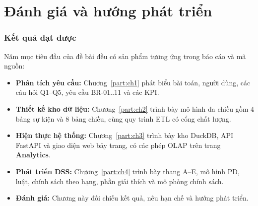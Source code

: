 \part{Đánh giá và hướng phát triển}
\label{part:ch5}
\section{Kết quả đạt được}
\label{sec:eval-results}
Năm mục tiêu đầu của đề bài đều có sản phẩm tương ứng trong báo cáo và mã nguồn:
\begin{itemize}[topsep=0pt, itemsep=1pt]
	\item \textbf{Phân tích yêu cầu:} Chương~\ref{part:ch1} phát biểu bài toán, người dùng, các câu hỏi Q1--Q5, yêu cầu BR-01..11 và các KPI.
	\item \textbf{Thiết kế kho dữ liệu:} Chương~\ref{part:ch2} trình bày mô hình đa chiều gồm $4$ bảng sự kiện và $8$ bảng chiều, cùng quy trình ETL có cổng chất lượng.
	\item \textbf{Hiện thực hệ thống:} Chương~\ref{part:ch3} trình bày kho DuckDB, API FastAPI và giao diện web bảy trang, có các phép OLAP trên trang \textbf{Analytics}.
	\item \textbf{Phát triển DSS:} Chương~\ref{part:ch4} trình bày thang A--E, mô hình PD, luật, chính sách theo hạng, phần giải thích và mô phỏng chính sách.
	\item \textbf{Đánh giá:} Chương này đối chiếu kết quả, nêu hạn chế và hướng phát triển.
\end{itemize}

